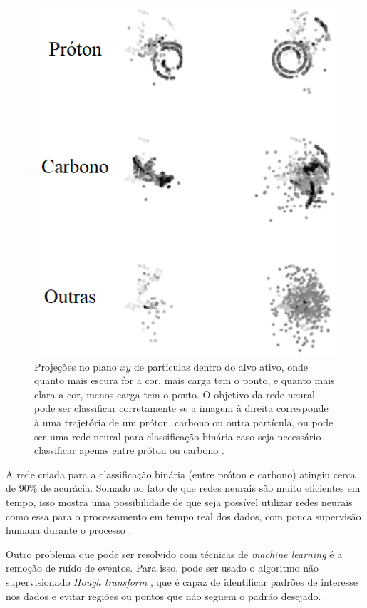\documentclass[a4paper,12pt,oneside]{book}
\begin{document}
\begin{appendices}
\begin{figure}[H]
    \centering
    \includegraphics[scale = 0.5]{figs/tpc_ml.png}
    \caption{Projeções no plano $xy$ de partículas dentro do alvo ativo, onde quanto mais escura for a cor, mais carga tem o ponto, e quanto mais clara a cor, menos carga tem o ponto. O objetivo da rede neural pode ser classificar corretamente se a imagem à direita corresponde à uma trajetória de um próton, carbono ou outra partícula, ou pode ser uma rede neural para classificação binária caso seja necessário classificar apenas entre próton ou carbono \cite{KUCHERAML}.}
    \label{fig:tpc_ml}
\end{figure}

\par A rede criada para a classificação binária (entre próton e carbono) atingiu cerca de 90\% de acurácia. Somado ao fato de que redes neurais são muito eficientes em tempo, isso mostra uma possibilidade de que seja possível utilizar redes neurais como essa para o processamento em tempo real dos dados, com pouca supervisão humana durante o processo \cite{KUCHERAML}.

\par Outro problema que pode ser resolvido com técnicas de \textit{machine learning} é a remoção de ruído de eventos. Para isso, pode ser usado o algoritmo não supervisionado \textit{Hough transform} \cite{hough}, que é capaz de identificar padrões de interesse nos dados e evitar regiões ou pontos que não seguem o padrão desejado. 



\end{appendices}
\end{document}
